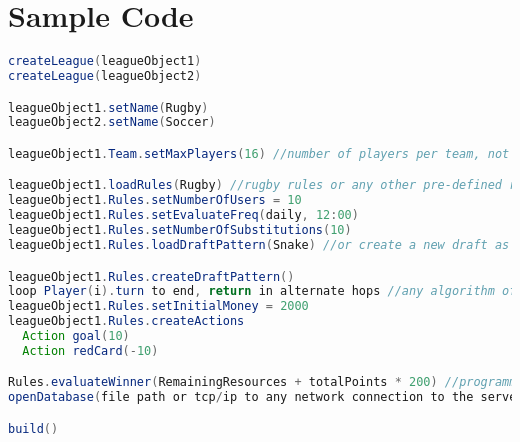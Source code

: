 \documentclass[12pt]{article}
\begin{document}
\section{Sample Code}
\begin{lstlisting}[language=Java,label=some-code,caption=FLOOD sample code]
createLeague(leagueObject1)
createLeague(leagueObject2)

leagueObject1.setName(Rugby)
leagueObject2.setName(Soccer)

leagueObject1.Team.setMaxPlayers(16) //number of players per team, not the number of users

leagueObject1.loadRules(Rugby) //rugby rules or any other pre-defined rules
leagueObject1.Rules.setNumberOfUsers = 10
leagueObject1.Rules.setEvaluateFreq(daily, 12:00) 
leagueObject1.Rules.setNumberOfSubstitutions(10)
leagueObject1.Rules.loadDraftPattern(Snake) //or create a new draft as follows 

leagueObject1.Rules.createDraftPattern()
loop Player(i).turn to end, return in alternate hops //any algorithm of the programmer's choice
leagueObject1.Rules.setInitialMoney = 2000 
leagueObject1.Rules.createActions
  Action goal(10)
  Action redCard(-10)

Rules.evaluateWinner(RemainingResources + totalPoints * 200) //programmer determines what formula is be used 
openDatabase(file path or tcp/ip to any network connection to the server)

build()
\end{lstlisting}
\end{document}
